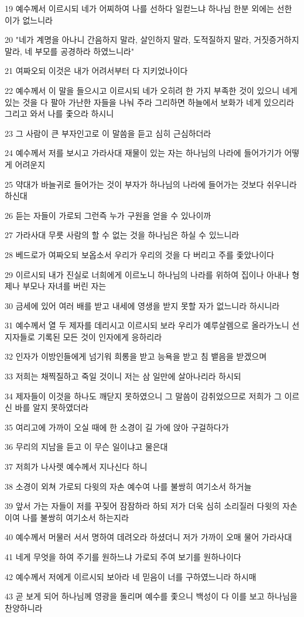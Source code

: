\par 19 예수께서 이르시되 네가 어찌하여 나를 선하다 일컫느냐 하나님 한분 외에는 선한 이가 없느니라
\par 20 "네가 계명을 아나니 간음하지 말라, 살인하지 말라, 도적질하지 말라, 거짓증거하지 말라, 네 부모를 공경하라 하였느니라"
\par 21 여짜오되 이것은 내가 어려서부터 다 지키었나이다
\par 22 예수께서 이 말을 들으시고 이르시되 네가 오히려 한 가지 부족한 것이 있으니 네게 있는 것을 다 팔아 가난한 자들을 나눠 주라 그리하면 하늘에서 보화가 네게 있으리라 그리고 와서 나를 좇으라 하시니
\par 23 그 사람이 큰 부자인고로 이 말씀을 듣고 심히 근심하더라
\par 24 예수께서 저를 보시고 가라사대 재물이 있는 자는 하나님의 나라에 들어가기가 어떻게 어려운지
\par 25 약대가 바늘귀로 들어가는 것이 부자가 하나님의 나라에 들어가는 것보다 쉬우니라 하신대
\par 26 듣는 자들이 가로되 그런즉 누가 구원을 얻을 수 있나이까
\par 27 가라사대 무릇 사람의 할 수 없는 것을 하나님은 하실 수 있느니라
\par 28 베드로가 여짜오되 보옵소서 우리가 우리의 것을 다 버리고 주를 좇았나이다
\par 29 이르시되 내가 진실로 너희에게 이르노니 하나님의 나라를 위하여 집이나 아내나 형제나 부모나 자녀를 버린 자는
\par 30 금세에 있어 여러 배를 받고 내세에 영생을 받지 못할 자가 없느니라 하시니라
\par 31 예수께서 열 두 제자를 데리시고 이르시되 보라 우리가 예루살렘으로 올라가노니 선지자들로 기록된 모든 것이 인자에게 응하리라
\par 32 인자가 이방인들에게 넘기워 희롱을 받고 능욕을 받고 침 뱉음을 받겠으며
\par 33 저희는 채찍질하고 죽일 것이니 저는 삼 일만에 살아나리라 하시되
\par 34 제자들이 이것을 하나도 깨닫지 못하였으니 그 말씀이 감취었으므로 저희가 그 이르신 바를 알지 못하였더라
\par 35 여리고에 가까이 오실 때에 한 소경이 길 가에 앉아 구걸하다가
\par 36 무리의 지남을 듣고 이 무슨 일이냐고 물은대
\par 37 저희가 나사렛 예수께서 지나신다 하니
\par 38 소경이 외쳐 가로되 다윗의 자손 예수여 나를 불쌍히 여기소서 하거늘
\par 39 앞서 가는 자들이 저를 꾸짖어 잠잠하라 하되 저가 더욱 심히 소리질러 다윗의 자손이여 나를 불쌍히 여기소서 하는지라
\par 40 예수께서 머물러 서서 명하여 데려오라 하셨더니 저가 가까이 오매 물어 가라사대
\par 41 네게 무엇을 하여 주기를 원하느냐 가로되 주여 보기를 원하나이다
\par 42 예수께서 저에게 이르시되 보아라 네 믿음이 너를 구하였느니라 하시매
\par 43 곧 보게 되어 하나님께 영광을 돌리며 예수를 좇으니 백성이 다 이를 보고 하나님을 찬양하니라

